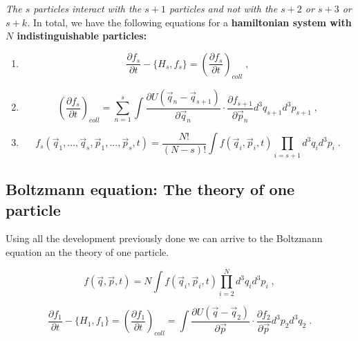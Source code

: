 \documentclass[spanish,notitlepage,letterpaper,11pt]{article} %
\numberwithin{equation}{subsection}
\begin{document}
    \textit{The $s$ particles interact with the $s+1$ particles and not with the $s+2$ or $s+3$ or $s+k$.} In total, we have the following equations for a \textbf{hamiltonian system with $N$ indistinguishable particles:}

    \begin{enumerate}
        \item 
        \begin{equation}
            \frac{\partial f_s}{\partial t} - \{H_s,f_s\} = \left(\frac{\partial f_s}{\partial t} \right)_{coll}\;,
        \end{equation}

        \item 

        \begin{equation}
            \left(\frac{\partial f_s}{\partial t} \right)_{coll} = \sum_{n=1}^s\int\frac{\partial U(\Vec{q}_n - \Vec{q}_{s+1})}{\partial \Vec{q}_n}\cdot \frac{\partial f_{s+1}}{\partial \Vec{p}_n}d^3q_{s+1}d^3p_{s+1}\;,
        \end{equation}

        \item 
        \begin{equation}
            f_s(\Vec{q}_1,...,\Vec{q}_s,\Vec{p}_1,...,\Vec{p}_s,t)= \frac{N!}{(N-s)!}\int f(\Vec{q}_i,\Vec{p}_i,t)\prod_{i=s+1}d^3q_id^3p_i\;.
        \end{equation}
    \end{enumerate}


    \subsection{Boltzmann equation: The theory of one particle}

    
    Using all the development previously done we can arrive to the Boltzmann equation an the theory of one particle. 

    \begin{equation}\label{eq:f1}
        f(\Vec{q},\Vec{p},t) = N\int f(\Vec{q}_i,\Vec{p}_i,t)\prod_{i=2}^Nd^3q_id^3p_i\;,
    \end{equation}

    \begin{equation}
        \frac{\partial f_1}{\partial t} - \{H_1,f_1\} = \left(\frac{\partial f_1}{\partial t}\right)_{coll} = \int \frac{\partial U(\Vec{q} - \Vec{q}_2)}{\partial \Vec{p}} \cdot \frac{\partial f_2}{\partial \Vec{p}}d^3p_2d^3q_2\;.
    \end{equation}
\end{document}
